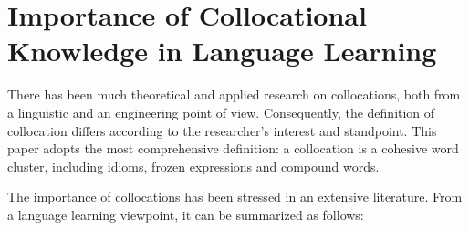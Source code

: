 \section{Importance of Collocational Knowledge in Language Learning}

There has been much theoretical and applied research
on collocations,
both from a linguistic and an engineering point of view.
Consequently, the definition of collocation differs according to
the researcher's interest and standpoint.
This paper adopts the most comprehensive definition:
a collocation is a cohesive word cluster,
including idioms, frozen expressions and compound words.

The importance of collocations has been stressed
in an extensive literature.
From a language learning viewpoint, it can be summarized as follows:

